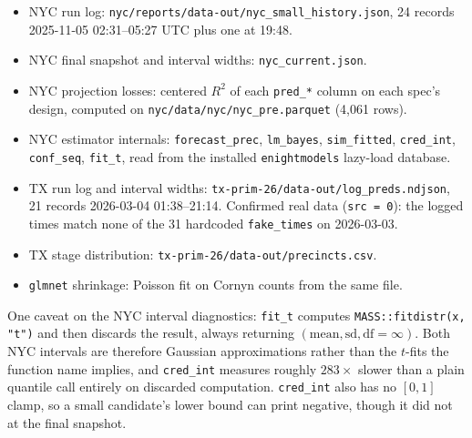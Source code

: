 \documentclass[11pt]{article}
\begin{document}
\begin{itemize}
  \item NYC run log: \texttt{nyc/reports/data-out/nyc\_small\_history.json}, 24 records
        2025-11-05 02:31--05:27 UTC plus one at 19:48.
  \item NYC final snapshot and interval widths: \texttt{nyc\_current.json}.
  \item NYC projection losses: centered $R^2$ of each \texttt{pred\_*} column on each
        spec's design, computed on \texttt{nyc/data/nyc/nyc\_pre.parquet} (4{,}061 rows).
  \item NYC estimator internals: \texttt{forecast\_prec}, \texttt{lm\_bayes},
        \texttt{sim\_fitted}, \texttt{cred\_int}, \texttt{conf\_seq}, \texttt{fit\_t},
        read from the installed \texttt{enightmodels} lazy-load database.
  \item TX run log and interval widths: \texttt{tx-prim-26/data-out/log\_preds.ndjson},
        21 records 2026-03-04 01:38--21:14. Confirmed real data (\texttt{src = 0}): the
        logged times match none of the 31 hardcoded \texttt{fake\_times} on 2026-03-03.
  \item TX stage distribution: \texttt{tx-prim-26/data-out/precincts.csv}.
  \item \texttt{glmnet} shrinkage: Poisson fit on Cornyn counts from the same file.
\end{itemize}

\noindent One caveat on the NYC interval diagnostics: \texttt{fit\_t} computes
\texttt{MASS::fitdistr(x, "t")} and then discards the result, always returning
$(\textrm{mean}, \textrm{sd}, \textrm{df} = \infty)$. Both NYC intervals are therefore
Gaussian approximations rather than the $t$-fits the function name implies, and
\texttt{cred\_int} measures roughly $283\times$ slower than a plain quantile call entirely
on discarded computation. \texttt{cred\_int} also has no $[0,1]$ clamp, so a small
candidate's lower bound can print negative, though it did not at the final snapshot.
\end{document}
